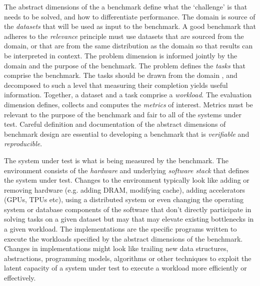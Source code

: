 The abstract dimensions of the a benchmark define what the `challenge' is that needs to be solved, and how to differentiate performance.
The domain is source of the \textit{datasets} that will be used as input to the benchmark.
A good benchmark that adheres to the \textit{relevance} principle must use datasets that are sourced from the domain, or that are from the same distribution as the domain so that results can be interpreted in context. 
The problem dimension is informed jointly by the domain and the purpose of the benchmark. 
The problem defines the \textit{tasks} that comprise the benchmark. 
The tasks should be drawn from the domain , and decomposed to such a level that measuring their completion yields useful information. 
Together, a dataset and a task comprise a \textit{workload}.
The evaluation dimension defines, collects and computes the \textit{metrics} of interest. 
Metrics must be relevant to the purpose of the benchmark and fair to all of the systems under test. 
Careful definition and documentation of the abstract dimensions of benchmark design are essential to developing a benchmark that is \textit{verifiable} and \textit{reproducible}.

The system under test is what is being measured by the benchmark. 
The environment consists of the \textit{hardware} and underlying \textit{software stack} that defines the system under test. 
Changes to the environment typically look like adding or removing hardware (e.g. adding DRAM, modifying cache), adding accelerators (GPUs, TPUs etc), using a distributed system or even changing the operating system or database components of the software that don't directly participate in solving tasks on a given dataset but may that may elevate existing bottlenecks in a given workload.
The implementations are the specific programs written to execute the workloads specified by the abstract dimensions of the benchmark. 
Changes in implementations might look like trailing new data structures, abstractions, programming models, algorithms or other techniques to exploit the latent capacity of a system under test to execute a workload more efficiently or effectively. 

